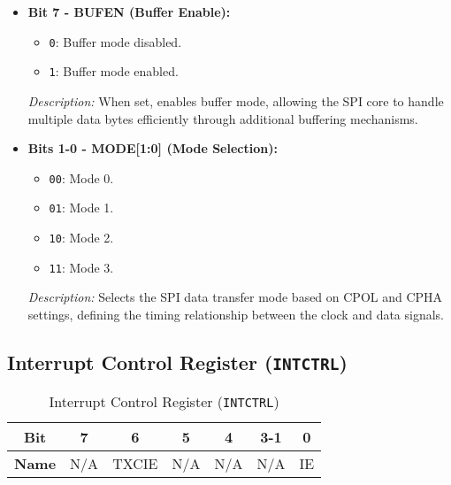   
  \begin{itemize}
      \item \textbf{Bit 7 - BUFEN (Buffer Enable):} 
      \begin{itemize}
          \item \texttt{0}: Buffer mode disabled.
          \item \texttt{1}: Buffer mode enabled.
      \end{itemize}
      \textit{Description:} When set, enables buffer mode, allowing the SPI core to handle multiple data bytes efficiently through additional buffering mechanisms.
      
      \item \textbf{Bits 1-0 - MODE[1:0] (Mode Selection):} 
      \begin{itemize}
          \item \texttt{00}: Mode 0.
          \item \texttt{01}: Mode 1.
          \item \texttt{10}: Mode 2.
          \item \texttt{11}: Mode 3.
      \end{itemize}
      \textit{Description:} Selects the SPI data transfer mode based on CPOL and CPHA settings, defining the timing relationship between the clock and data signals.
  \end{itemize}
  
  \subsection{Interrupt Control Register (\texttt{INTCTRL})}
  \label{sec:intctrl}
  
  \begin{table}[H]
      \centering
      \caption{Interrupt Control Register (\texttt{INTCTRL})}
      \begin{tabular}{@{}ccccccc@{}}
          \toprule
          \textbf{Bit} & 7 & 6 & 5 & 4 & 3-1 & 0 \\ \midrule
          \textbf{Name} & N/A & TXCIE & N/A & N/A & N/A & IE \\ \bottomrule
      \end{tabular}
      \label{tab:intctrl}
  \end{table}
  
